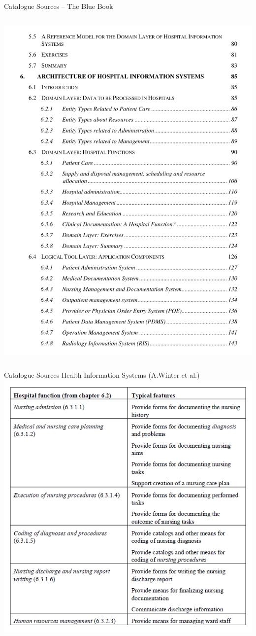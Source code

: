 \documentclass[aspectratio=1610,12pt]{beamer}
\newcommand{\enquote}[1]{{\glqq#1\grqq{}}}
\begin{document}
\begin{frame}{Catalogue Sources -- The \enquote{Blue Book}}
\begin{columns}
  \includegraphics[width=.9\textwidth,height=.8\textheight]{img/bb-content.png}
\end{columns}
\end{frame}

\begin{frame}{Catalogue Sources}
  \centering
  \large Health Information Systems (A.Winter et al.)
  \includegraphics[height=.7\textheight]{img/bb-table.png}
\end{frame}
\end{document}
